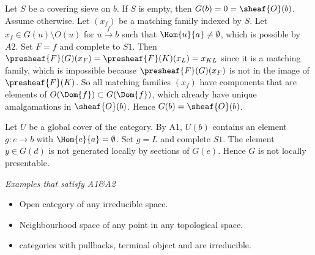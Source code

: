 \begin{example}

Let $S$ be a covering sieve on $b$. If $S$ is empty, then $G(b) = 0 = \sheaf{O}(b)$.
Assume otherwise.
Let $(x_f)$ be a matching family indexed by $S$.
Let $x_f\in G(u)\setminus O(u)$ for $u\xrightarrow{f} b$ such that $\Hom{u}{a} \neq \emptyset$, 
which is possible by $A2$. Set $F=f$ and complete to $S1$. Then $\presheaf{F}(G)(x_F)= \presheaf{F}(K)(x_L) = x_{KL}$ since it is a matching family,
which is impossible because $\presheaf{F}(G)(x_F)$ is not in the image of $\presheaf{F}(K)$.
So all matching families $(x_f)$ have components that are elements of $O(\Dom{f})\subset G(\Dom{f})$, 
which already have unique amalgamations in $\sheaf{O}(b)$. 
Hence $G(b)= \sheaf{O}(b)$.

Let $U$ be a global cover of the category.
By A1, $U(b)$ contains an element $g:e\rightarrow b$ with $\Hom{e}{a} = \emptyset$.
Set $g=L$ and complete $S1$.
The element $y\in G(d)$ is not generated locally by sections of $G(e)$.
Hence $G$ is not locally presentable.

\emph{Examples that satisfy A1\&A2}
\begin{itemize}
\item Open category of any irreducible space.
\item Neighbourhood space of any point in any topological space.
\item categories with pullbacks, terminal object and are irreducible.
\end{itemize}
\end{example}
